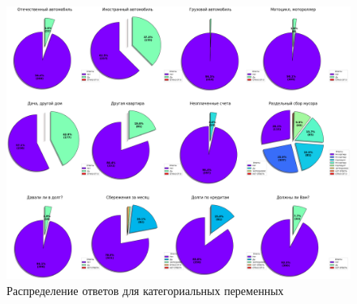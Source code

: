 \documentclass[12pt]{report}
\begin{document}
    \begin{figure}[H]
      \includegraphics[scale=0.3]{./title/output.png}
      \caption{Распределение ответов для категориальных переменных}
    \end{figure}
\end{document}
